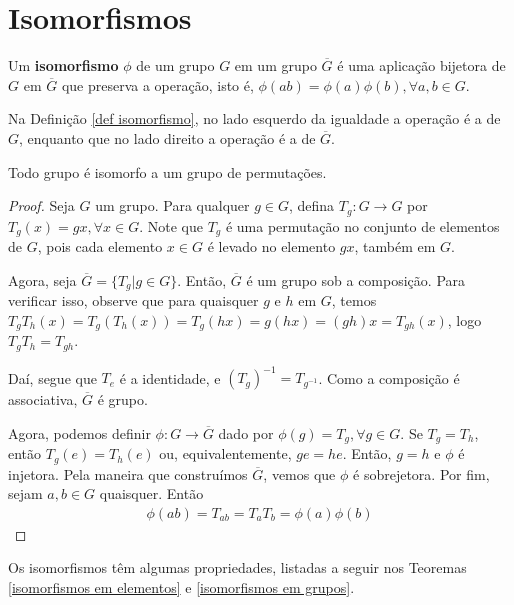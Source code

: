 \section{Isomorfismos}

    \begin{definition}
		\label{def isomorfismo}
		Um \textbf{isomorfismo} $\phi$ de um grupo $G$ em um grupo $\overline{G}$ é uma aplicação bijetora de $G$ em $\overline{G}$ que preserva a operação, isto é, $\phi(ab) = \phi(a)\phi(b),\forall a,b\in G$.
	\end{definition}
	\par\vspace{0.3cm} Na Definição \eqref{def isomorfismo}, no lado esquerdo da igualdade a operação é a de $G$, enquanto que no lado direito a operação é a de $\overline{G}$.
	
	\begin{theorem}
		\label{Cayley}
		Todo grupo é isomorfo a um grupo de permutações.
	\end{theorem}
	
	\begin{proof}
		Seja $G$ um grupo. Para qualquer $g\in G$, defina $T_g:G\to G$ por $T_g(x) = gx, \forall x\in G$. Note que $T_g$ é uma permutação no conjunto de elementos de $G$, pois cada elemento $x\in G$ é levado no elemento $gx$, também em $G$. 
		\par\vspace{0.3cm} Agora, seja $\overline{G} = \{ T_g | g\in G \}$. Então, $\overline{G}$ é um grupo sob a composição. Para verificar isso, observe que para quaisquer $g$ e $h$ em $G$, temos $T_gT_h(x) = T_g(T_h(x)) = T_g(hx) = g(hx) = (gh)x = T_{gh}(x)$, logo $T_gT_h = T_{gh}$.
		\par\vspace{0.3cm} Daí, segue que $T_e$ é a identidade, e $(T_g)^{-1} = T_{g^{-1}}$. Como a composição é associativa, $\overline{G}$ é grupo.
		\par\vspace{0.3cm} Agora, podemos definir $\phi: G\to\overline{G}$ dado por $\phi(g) = T_g, \forall g\in G$. Se $T_g = T_h$, então $T_g(e) = T_h(e)$ ou, equivalentemente, $ge = he$. Então, $g = h$ e $\phi$ é injetora. Pela maneira que construímos $\overline{G}$, vemos que $\phi$ é sobrejetora. Por fim, sejam $a,b\in G$ quaisquer. Então
		\begin{align*}
		\phi(ab) = T_{ab} = T_aT_b = \phi(a)\phi(b)
		\end{align*}
	\end{proof}
	\par\vspace{0.3cm} Os isomorfismos têm algumas propriedades, listadas a seguir nos Teoremas \eqref{isomorfismos em elementos} e \eqref{isomorfismos em grupos}.
	
